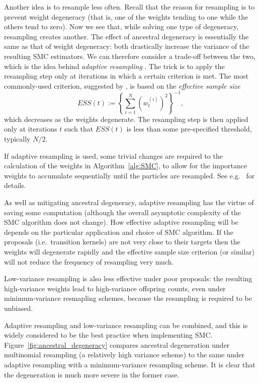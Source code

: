 Another idea is to resample less often. Recall that the reason for resampling is to prevent weight degeneracy (that is, one of the weights tending to one while the others tend to zero). Now we see that, while solving one type of degeneracy, resampling creates another. The effect of ancestral degeneracy is essentially the same as that of weight degeneracy: both drastically increase the variance of the resulting SMC estimators. 
We can therefore consider a trade-off between the two, which is the idea behind \emph{adaptive resampling} \parencite[Section 4]{liu1995}.
The trick is to apply the resampling step only at iterations in which a certain criterion is met. The most commonly-used criterion, suggested by \textcite[Equation (14)]{liu1995}, is based on the \emph{effective sample size}
\begin{equation*}
ESS(t) := \left\{ \sum_{i=1}^N (w_t^{(i)})^2 \right\}^{-1} ,
\end{equation*}
which decreases as the weights degenerate.
The resampling step is then applied only at iterations $t$ such that $ESS(t)$ is less than some pre-specified threshold, typically $N/2$. %

If adaptive resampling is used, some trivial changes are required to the calculation of the weights in Algorithm~\ref{alg:SMC}, to allow for the importance weights to accumulate sequentially until the particles are resampled. See e.g.\ \textcite[Section 10.2]{chopin2020} for details.

As well as mitigating ancestral degeneracy, adaptive resampling has the virtue of saving some computation (although the overall asymptotic complexity of the SMC algorithm does not change).
How effective adaptive resampling will be depends on the particular application and choice of SMC algorithm. If the proposals (i.e.\ transition kernels) are not very close to their targets then the weights will degenerate rapidly and the effective sample size criterion (or similar) will not reduce the frequency of resampling very much.

Low-variance resampling is also less effective under poor proposals: the resulting high-variance weights lead to high-variance offspring counts, even under minimum-variance resmapling schemes, because the resampling is required to be unbiased.

Adaptive resampling and low-variance resampling can be combined, and this is widely considered to be the best practice when implementing SMC.
Figure~\ref{fig:ancestral_degeneracy} compares ancestral degeneration under multinomial resampling (a relatively high variance scheme) to the same under adaptive resampling with a minimum-variance resampling scheme.
It is clear that the degeneration is much more severe in the former case.

